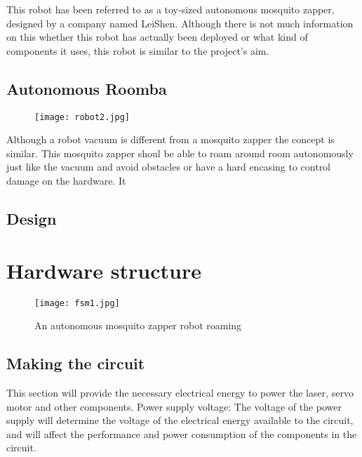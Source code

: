 \documentclass[11pt]{article}
\begin{document}
 This robot has been referred to as a toy-sized autonomous mosquito zapper, designed by a company named LeiShen. Although there is not much information on this whether this robot has actually been deployed or what kind of components it uses, this robot is similar to the project's aim.


\subsection{Autonomous Roomba}
  \begin{center}
	
	
	\begin{figure}[H]
		\centering
		\texttt{[image: robot2.jpg]}
		
		\label{fig:Robot}
	\end{figure}
\end{center}

Although a robot vacuum is different from a mosquito zapper the concept is similar. This mosquito zapper shoul be able to roam around room autonomously just like the vacuum and avoid obstacles or have a hard encasing to control damage on the hardware. It 



 

 	
 \subsection{Design}
 
 
 
 
 
 	\section{Hardware structure}
 	 
 	
 	\begin{center}
 		
 		
 		\begin{figure}[H]
 			\centering
 			\texttt{[image: fsm1.jpg]}
 			\caption{An autonomous mosquito zapper robot roaming }
 			\label{fig:robot}
 		\end{figure}
 	\end{center}
 	
 	
 	\subsection{Making the circuit}
 	
 	
 	This section will provide the necessary electrical energy to power the laser, servo motor and other components.
Power supply voltage: The voltage of the power supply will determine the voltage of the electrical energy available to the circuit, and will affect the performance and power consumption of the components in the circuit.
\end{document}
